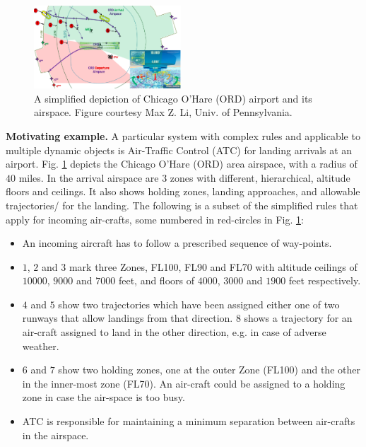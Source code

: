\begin{figure}[t]
\centering
\includegraphics[width=0.49\textwidth]{figures/ATC_Example}
\caption{{\small A simplified depiction of Chicago O'Hare (ORD) airport and its airspace.  Figure courtesy Max Z. Li, Univ. of Pennsylvania.}}
\label{fig:atc_example}
\end{figure}


\textbf{Motivating example.} A particular system with complex rules and applicable to multiple dynamic objects is Air-Traffic Control (ATC) for landing arrivals at an airport. Fig. \ref{fig:atc_example} depicts the Chicago O'Hare (ORD) area airspace, with a radius of $40$ miles. In the arrival airspace are 3 zones with different, hierarchical, altitude floors and ceilings. It also shows holding zones, landing approaches, and allowable trajectories/ for the landing. The following is a subset of the simplified rules that apply for incoming air-crafts, some numbered in red-circles in Fig. \ref{fig:atc_example}:

\begin{itemize}
\vspace{-5pt}
\item An incoming aircraft has to follow a prescribed sequence of way-points.
\vspace{-5pt}
\item $1$, $2$ and $3$ mark three Zones, FL100, FL90 and FL70 with altitude ceilings of $10000$, $9000$ and $7000$ feet, and floors of $4000$, $3000$ and $1900$ feet respectively.
\vspace{-5pt}
\item $4$ and $5$ show two trajectories which have been assigned either one of two runways that allow landings from that direction. $8$ shows a trajectory for an air-craft assigned to land in the other direction, e.g. in case of adverse weather.
\vspace{-5pt}
\item $6$ and $7$ show two holding zones, one at the outer Zone (FL100) and the other in the inner-most zone (FL70). An air-craft could be assigned to a holding zone in case the air-space is too busy.
\vspace{-5pt}
\item ATC is responsible for maintaining a minimum separation between air-crafts in the airspace.
\vspace{-5pt}
\end{itemize}

